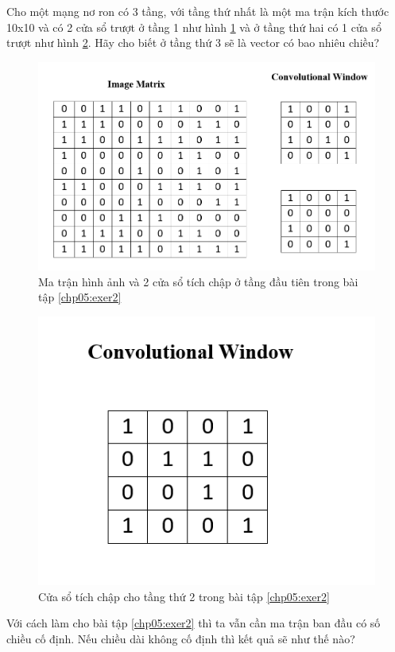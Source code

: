 \begin{exer}
\label{chp05:exer2}
Cho một mạng nơ ron có 3 tầng, với tầng thứ nhất là một ma trận kích thước 10x10 và có 2 cửa sổ trượt ở tầng 1 như hình \ref{fig:CNNExercise2a} và ở tầng thứ hai có 1 cửa sổ trượt như hình \ref{fig:CNNExercise2b}. Hãy cho biết ở tầng thứ 3 sẽ là vector có bao nhiêu chiều?
\begin{figure}[!h]
	\centering
		\includegraphics[width=1.0\columnwidth]{books/artificial-neural-network/chapter05/figure/exercise2a.png}
		\centering
	\caption{Ma trận hình ảnh và 2 cửa sổ tích chập ở tầng đầu tiên trong bài tập \ref{chp05:exer2}}
	\label{fig:CNNExercise2a}
\end{figure}
\begin{figure}[!h]
	\centering
		\includegraphics[width=0.6\columnwidth]{books/artificial-neural-network/chapter05/figure/exercise2b.png}
		\centering
	\caption{Cửa sổ tích chập cho tầng thứ 2 trong bài tập \ref{chp05:exer2}}
	\label{fig:CNNExercise2b}
\end{figure}
\end{exer}

\begin{exer}
Với cách làm cho bài tập \ref{chp05:exer2} thì ta vẫn cần ma trận ban đầu có số chiều cố định. Nếu chiều dài không cố định thì kết quả sẽ như thế nào?
\end{exer}

